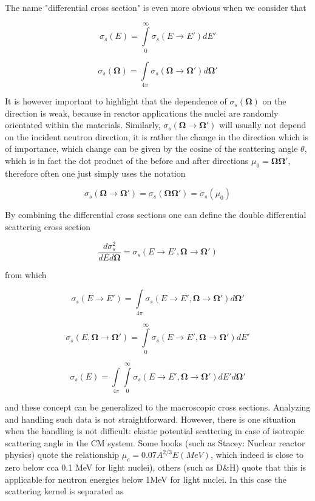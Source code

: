 The name "differential cross section" is even more obvious when we consider that

$$\sigma_s(E)=\int\limits_0^\infty\sigma_s(E\rightarrow E')dE'$$

$$\sigma_s(\mathbf{\Omega})=\int\limits_{4\pi}\sigma_s(\mathbf{\Omega}\rightarrow \mathbf{\Omega}')d\mathbf{\Omega}'$$

It is however important to highlight that the dependence of $\sigma_s(\mathbf{\Omega})$ on the direction is weak, because in reactor applications the nuclei are randomly orientated within the materials. Similarly, $\sigma_s(\mathbf{\Omega}\rightarrow\mathbf{\Omega}')$ will usually not depend on the incident neutron direction, it is rather the change in the direction which is of importance, which change can be given by the cosine of the scattering angle $\theta$, which is in fact the dot product of the before and after directions $\mu_0=\mathbf{\Omega}\mathbf{\Omega}'$, therefore often one just simply uses the notation

$$\sigma_s(\mathbf{\Omega}\rightarrow \mathbf{\Omega}')=\sigma_s(\mathbf{\Omega}\mathbf{\Omega}')=\sigma_s(\mu_0)$$

By combining the differential cross sections one can define the double differential scattering cross section

$$\frac{d\sigma_s^2}{dEd\mathbf{\Omega}}=\sigma_s(E\rightarrow E',\mathbf{\Omega}\rightarrow \mathbf{\Omega}')$$

\noindent from which

$$\sigma_s(E\rightarrow E')=\int\limits_{4\pi}\sigma_s(E\rightarrow E',\mathbf{\Omega}\rightarrow \mathbf{\Omega}')d\mathbf{\Omega}'$$

$$\sigma_s(E,\mathbf{\Omega}\rightarrow \mathbf{\Omega}')=\int\limits_{0}^\infty\sigma_s(E\rightarrow E',\mathbf{\Omega}\rightarrow \mathbf{\Omega}')dE'$$

$$\sigma_s(E)=\int\limits_{4\pi}\int\limits_{0}^\infty\sigma_s(E\rightarrow E',\mathbf{\Omega}\rightarrow \mathbf{\Omega}')dE'd\mathbf{\Omega}'$$

\noindent and these concept can be generalized to the macroscopic cross sections. Analyzing and handling such data is not straightforward. However, there is one situation when the handling is not difficult: elastic potential scattering in case of isotropic scattering angle in the CM system. Some books (such as Stacey: Nuclear reactor physics) quote the relationship $\mu_c=0.07A^{2/3}E(MeV)$, which indeed is close to zero below cca 0.1 MeV for light nuclei), others (such as D\&H) quote that this is applicable for neutron energies below 1MeV for light nuclei. In this case the scattering kernel is separated as

